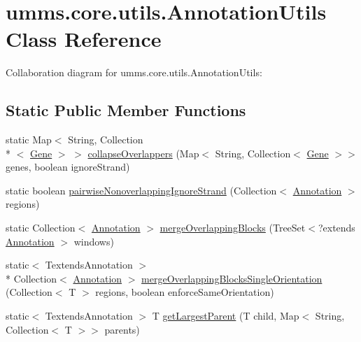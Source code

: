 \hypertarget{classumms_1_1core_1_1utils_1_1_annotation_utils}{\section{umms.\+core.\+utils.\+Annotation\+Utils Class Reference}
\label{classumms_1_1core_1_1utils_1_1_annotation_utils}
}


Collaboration diagram for umms.\+core.\+utils.\+Annotation\+Utils\+:
\subsection*{Static Public Member Functions}
\begin{DoxyCompactItemize}
\item 
static Map$<$ String, Collection\\*
$<$ \hyperlink{classumms_1_1core_1_1annotation_1_1_gene}{Gene} $>$ $>$ \hyperlink{classumms_1_1core_1_1utils_1_1_annotation_utils_af14dd663711ec5bb378f70875f114e41}{collapse\+Overlappers} (Map$<$ String, Collection$<$ \hyperlink{classumms_1_1core_1_1annotation_1_1_gene}{Gene} $>$$>$ genes, boolean ignore\+Strand)
\item 
static boolean \hyperlink{classumms_1_1core_1_1utils_1_1_annotation_utils_adbf08ad30438460c5ef2d903196b08dd}{pairwise\+Nonoverlapping\+Ignore\+Strand} (Collection$<$ \hyperlink{interfaceumms_1_1core_1_1annotation_1_1_annotation}{Annotation} $>$ regions)
\item 
static Collection$<$ \hyperlink{interfaceumms_1_1core_1_1annotation_1_1_annotation}{Annotation} $>$ \hyperlink{classumms_1_1core_1_1utils_1_1_annotation_utils_afa2cbf048459a0670cccff99e9140b6e}{merge\+Overlapping\+Blocks} (Tree\+Set$<$?extends \hyperlink{interfaceumms_1_1core_1_1annotation_1_1_annotation}{Annotation} $>$ windows)
\item 
static$<$ Textends\+Annotation $>$\\*
 Collection$<$ \hyperlink{interfaceumms_1_1core_1_1annotation_1_1_annotation}{Annotation} $>$ \hyperlink{classumms_1_1core_1_1utils_1_1_annotation_utils_a73c090856164c0c8917b1dad326e515f}{merge\+Overlapping\+Blocks\+Single\+Orientation} (Collection$<$ T $>$ regions, boolean enforce\+Same\+Orientation)
\item 
static$<$ Textends\+Annotation $>$ T \hyperlink{classumms_1_1core_1_1utils_1_1_annotation_utils_adef9249ccd39f5aa8d2fed2b91e3dcc8}{get\+Largest\+Parent} (T child, Map$<$ String, Collection$<$ T $>$$>$ parents)

\end{DoxyCompactItemize}
